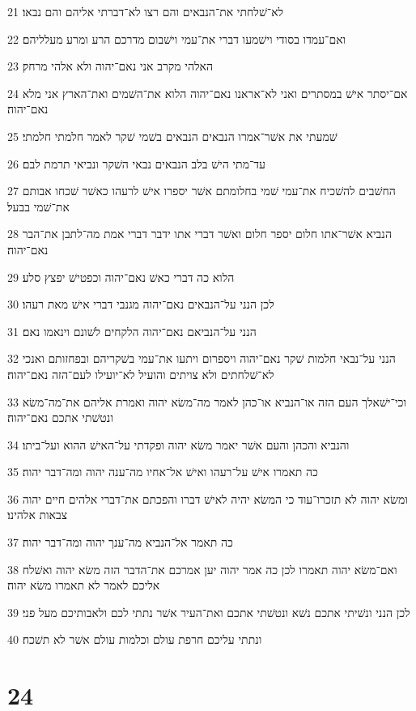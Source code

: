 \par 21 לא־שׁלחתי את־הנבאים והם רצו לא־דברתי אליהם והם נבאו׃
\par 22 ואם־עמדו בסודי וישׁמעו דברי את־עמי וישׁבום מדרכם הרע ומרע מעלליהם׃
\par 23 האלהי מקרב אני נאם־יהוה ולא אלהי מרחק׃
\par 24 אם־יסתר אישׁ במסתרים ואני לא־אראנו נאם־יהוה הלוא את־השׁמים ואת־הארץ אני מלא נאם־יהוה׃
\par 25 שׁמעתי את אשׁר־אמרו הנבאים הנבאים בשׁמי שׁקר לאמר חלמתי חלמתי׃
\par 26 עד־מתי הישׁ בלב הנבאים נבאי השׁקר ונביאי תרמת לבם׃
\par 27 החשׁבים להשׁכיח את־עמי שׁמי בחלומתם אשׁר יספרו אישׁ לרעהו כאשׁר שׁכחו אבותם את־שׁמי בבעל׃
\par 28 הנביא אשׁר־אתו חלום יספר חלום ואשׁר דברי אתו ידבר דברי אמת מה־לתבן את־הבר נאם־יהוה׃
\par 29 הלוא כה דברי כאשׁ נאם־יהוה וכפטישׁ יפצץ סלע׃
\par 30 לכן הנני על־הנבאים נאם־יהוה מגנבי דברי אישׁ מאת רעהו׃
\par 31 הנני על־הנביאם נאם־יהוה הלקחים לשׁונם וינאמו נאם׃
\par 32 הנני על־נבאי חלמות שׁקר נאם־יהוה ויספרום ויתעו את־עמי בשׁקריהם ובפחזותם ואנכי לא־שׁלחתים ולא צויתים והועיל לא־יועילו לעם־הזה נאם־יהוה׃
\par 33 וכי־ישׁאלך העם הזה או־הנביא או־כהן לאמר מה־משׂא יהוה ואמרת אליהם את־מה־משׂא ונטשׁתי אתכם נאם־יהוה׃
\par 34 והנביא והכהן והעם אשׁר יאמר משׂא יהוה ופקדתי על־האישׁ ההוא ועל־ביתו׃
\par 35 כה תאמרו אישׁ על־רעהו ואישׁ אל־אחיו מה־ענה יהוה ומה־דבר יהוה׃
\par 36 ומשׂא יהוה לא תזכרו־עוד כי המשׂא יהיה לאישׁ דברו והפכתם את־דברי אלהים חיים יהוה צבאות אלהינו׃
\par 37 כה תאמר אל־הנביא מה־ענך יהוה ומה־דבר יהוה׃
\par 38 ואם־משׂא יהוה תאמרו לכן כה אמר יהוה יען אמרכם את־הדבר הזה משׂא יהוה ואשׁלח אליכם לאמר לא תאמרו משׂא יהוה׃
\par 39 לכן הנני ונשׁיתי אתכם נשׁא ונטשׁתי אתכם ואת־העיר אשׁר נתתי לכם ולאבותיכם מעל פני׃
\par 40 ונתתי עליכם חרפת עולם וכלמות עולם אשׁר לא תשׁכח׃

\chapter{24}

